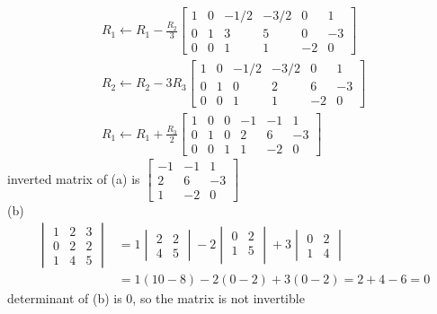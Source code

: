 \documentclass[12pt, border = 4pt, multi]{article} %
\begin{document}
\begin{align*}
R_1 \leftarrow R_1 - \frac{R_2}{3}
\left[
\begin{array}{ccc|ccc}
1 & 0 & -1 / 2 & -3 / 2 & 0 & 1\\
0 & 1 & 3 & 5 & 0 & -3\\
0 & 0 & 1 & 1 & -2 & 0
\end{array}
\right]\\
R_2 \leftarrow R_2 - 3 R_3
\left[
\begin{array}{ccc|ccc}
1 & 0 & -1 / 2 & -3 / 2 & 0 & 1\\
0 & 1 & 0 & 2 & 6 & -3\\
0 & 0 & 1 & 1 & -2 & 0
\end{array}
\right]\\
R_1 \leftarrow R_1 + \frac{R_3}{2}
\left[
\begin{array}{ccc|ccc}
1 & 0 & 0 & -1 & -1 & 1\\
0 & 1 & 0 & 2 & 6 & -3\\
0 & 0 & 1 & 1 & -2 & 0
\end{array}
\right]
\end{align*}
inverted matrix of (a) is 
$\begin{bmatrix}
-1 & -1 & 1\\
2 & 6 & -3\\
1 & -2 & 0
\end{bmatrix}$\\
(b)
\begin{align*}
\begin{vmatrix}
1 & 2 & 3\\ 
0 & 2 & 2\\
1 & 4 & 5
\end{vmatrix}
&=
1
\begin{vmatrix}
2 & 2\\
4 & 5
\end{vmatrix}
- 2
\begin{vmatrix}
0 & 2\\
1 & 5\\
\end{vmatrix}
+ 3
\begin{vmatrix}
0 & 2\\
1 & 4
\end{vmatrix}\\
&= 1(10 - 8) - 2(0 - 2) + 3(0 - 2) = 2 + 4 - 6 = 0
\end{align*}
determinant of (b) is 0, so the matrix is not invertible
\end{document}
